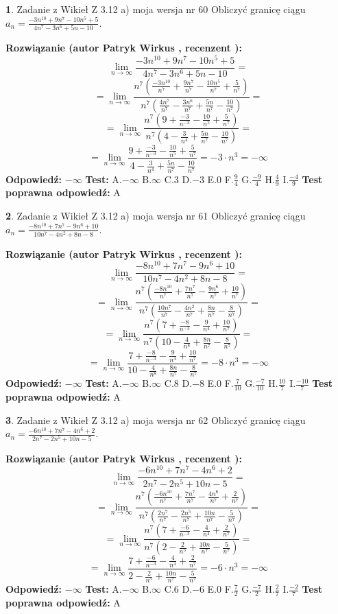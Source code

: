 \documentclass[12pt, a4paper]{article}
\theoremstyle{definition} %
\newtheorem{zad}{}
\newcommand{\zadStart}[1]{\begin{zad}#1\newline}
\newcommand{\zadStop}{\end{zad}}
\newcommand{\rozwStart}[2]{\noindent \textbf{Rozwiązanie (autor #1 , recenzent #2): }\newline}
\newcommand{\rozwStop}{\newline}
\newcommand{\odpStart}{\noindent \textbf{Odpowiedź:}\newline}
\newcommand{\odpStop}{\newline}
\newcommand{\testStart}{\noindent \textbf{Test:}\newline}
\newcommand{\testStop}{\newline}
\newcommand{\kluczStart}{\noindent \textbf{Test poprawna odpowiedź:}\newline}
\newcommand{\kluczStop}{\newline}
\begin{document}
\zadStart{Zadanie z Wikieł Z 3.12 a) moja wersja nr 60}
Obliczyć granicę ciągu $a_{n}=\frac{-3n^{10}+9n^{7}-10n^{5}+5}{4n^{7}-3n^{6}+5n-10}$.
\zadStop
\rozwStart{Patryk Wirkus}{}
$$\lim\limits_{n\to\infty}\frac{-3n^{10}+9n^{7}-10n^{5}+5}{4n^{7}-3n^{6}+5n-10}=$$
$$=\lim\limits_{n\to\infty}\frac{n^{7}\left(\frac{-3n^{10}}{n^{7}}+\frac{9n^{7}}{n^{7}}-\frac{10n^{5}}{n^{7}}+\frac{5}{n^{7}}\right)}{n^{7}\left(\frac{4n^{7}}{n^{7}}-\frac{3n^{6}}{n^{7}}+\frac{5n}{n^{7}}-\frac{10}{n^{7}}\right)}=$$
$$=\lim\limits_{n\to\infty}\frac{n^{7}\left(9+\frac{-3}{n^{-3}}-\frac{10}{n^{5}}+\frac{5}{n^{7}}\right)}
{n^{7}\left(4-\frac{3}{n^{4}}+\frac{5n}{n^{7}}-\frac{10}{n^{7}}\right)}=$$
$$=\lim\limits_{n\to\infty}\frac{9+\frac{-3}{n^{-3}}-\frac{10}{n^{5}}+\frac{5}{n^{7}}}{4-\frac{3}{n^{4}}+\frac{5n}{n^{7}}-\frac{10}{n^{7}}}=-3\cdot n^{3} = -\infty$$
\rozwStop
\odpStart
$-\infty$
\odpStop
\testStart
A.$-\infty$
B.$\infty$
C.$3$
D.$-3$
E.$0$
F.$\frac{9}{4}$
G.$\frac{-9}{4}$
H.$\frac{4}{9}$
I.$\frac{-4}{9}$
\testStop
\kluczStart
A
\kluczStop



\zadStart{Zadanie z Wikieł Z 3.12 a) moja wersja nr 61}
Obliczyć granicę ciągu $a_{n}=\frac{-8n^{10}+7n^{7}-9n^{6}+10}{10n^{7}-4n^{2}+8n-8}$.
\zadStop
\rozwStart{Patryk Wirkus}{}
$$\lim\limits_{n\to\infty}\frac{-8n^{10}+7n^{7}-9n^{6}+10}{10n^{7}-4n^{2}+8n-8}=$$
$$=\lim\limits_{n\to\infty}\frac{n^{7}\left(\frac{-8n^{10}}{n^{7}}+\frac{7n^{7}}{n^{7}}-\frac{9n^{6}}{n^{7}}+\frac{10}{n^{7}}\right)}{n^{7}\left(\frac{10n^{7}}{n^{7}}-\frac{4n^{2}}{n^{7}}+\frac{8n}{n^{7}}-\frac{8}{n^{7}}\right)}=$$
$$=\lim\limits_{n\to\infty}\frac{n^{7}\left(7+\frac{-8}{n^{-3}}-\frac{9}{n^{4}}+\frac{10}{n^{7}}\right)}
{n^{7}\left(10-\frac{4}{n^{8}}+\frac{8n}{n^{7}}-\frac{8}{n^{7}}\right)}=$$
$$=\lim\limits_{n\to\infty}\frac{7+\frac{-8}{n^{-3}}-\frac{9}{n^{4}}+\frac{10}{n^{7}}}{10-\frac{4}{n^{8}}+\frac{8n}{n^{7}}-\frac{8}{n^{7}}}=-8\cdot n^{3} = -\infty$$
\rozwStop
\odpStart
$-\infty$
\odpStop
\testStart
A.$-\infty$
B.$\infty$
C.$8$
D.$-8$
E.$0$
F.$\frac{7}{10}$
G.$\frac{-7}{10}$
H.$\frac{10}{7}$
I.$\frac{-10}{7}$
\testStop
\kluczStart
A
\kluczStop



\zadStart{Zadanie z Wikieł Z 3.12 a) moja wersja nr 62}
Obliczyć granicę ciągu $a_{n}=\frac{-6n^{10}+7n^{7}-4n^{6}+2}{2n^{7}-2n^{5}+10n-5}$.
\zadStop
\rozwStart{Patryk Wirkus}{}
$$\lim\limits_{n\to\infty}\frac{-6n^{10}+7n^{7}-4n^{6}+2}{2n^{7}-2n^{5}+10n-5}=$$
$$=\lim\limits_{n\to\infty}\frac{n^{7}\left(\frac{-6n^{10}}{n^{7}}+\frac{7n^{7}}{n^{7}}-\frac{4n^{6}}{n^{7}}+\frac{2}{n^{7}}\right)}{n^{7}\left(\frac{2n^{7}}{n^{7}}-\frac{2n^{5}}{n^{7}}+\frac{10n}{n^{7}}-\frac{5}{n^{7}}\right)}=$$
$$=\lim\limits_{n\to\infty}\frac{n^{7}\left(7+\frac{-6}{n^{-3}}-\frac{4}{n^{4}}+\frac{2}{n^{7}}\right)}
{n^{7}\left(2-\frac{2}{n^{5}}+\frac{10n}{n^{7}}-\frac{5}{n^{7}}\right)}=$$
$$=\lim\limits_{n\to\infty}\frac{7+\frac{-6}{n^{-3}}-\frac{4}{n^{4}}+\frac{2}{n^{7}}}{2-\frac{2}{n^{5}}+\frac{10n}{n^{7}}-\frac{5}{n^{7}}}=-6\cdot n^{3} = -\infty$$
\rozwStop
\odpStart
$-\infty$
\odpStop
\testStart
A.$-\infty$
B.$\infty$
C.$6$
D.$-6$
E.$0$
F.$\frac{7}{2}$
G.$\frac{-7}{2}$
H.$\frac{2}{7}$
I.$\frac{-2}{7}$
\testStop
\kluczStart
A
\kluczStop
\end{document}
